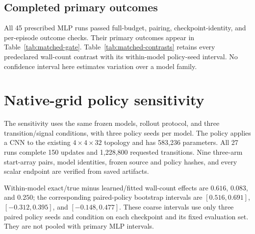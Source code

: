 \subsection{Completed primary outcomes}
All 45 prescribed MLP runs passed full-budget, pairing, checkpoint-identity, and per-episode outcome
checks. Their primary outcomes appear in Table~\ref{tab:matched-gate}. Table~\ref{tab:matched-contrasts}
retains every predeclared wall-count contrast with its within-model policy-seed interval. No confidence
interval here estimates variation over a model family.

\begin{table}[ht]
\centering
\caption{\textbf{The exact training environment does not make this PPO recipe solve the gate.}
Final real-environment outcomes, mean $\pm$ sample standard deviation across five policy seeds
per row. Each of three fitted models receives all three matched conditions. None of the 45 policies
exceeds $50\%$ survival. ``Fitted'' means the unchanged learned reward and termination heads;
``true'' means simulator signals.}
\label{tab:matched-gate}
\end{table}

\begin{table}[ht]
\centering
\caption{Matched primary wall-count differences. Intervals are 95\% percentile bootstraps over
five paired policy seeds within one fixed model, conditional on its evaluation set. They are
unadjusted descriptive intervals; all three prespecified contrasts are retained.}
\label{tab:matched-contrasts}
\end{table}



\section{Native-grid policy sensitivity}
\label{app:native-grid}
The sensitivity uses the same frozen models, rollout protocol, and three transition/signal
conditions, with three policy seeds per model. The policy applies a CNN to the existing
$4\times4\times32$ topology and has 583,236 parameters. All 27 runs complete 150 updates and
1,228,800 requested transitions. Nine three-arm start-array pairs, model identities, frozen source
and policy hashes, and every scalar endpoint are verified from saved artifacts.

\begin{table}[ht]
\centering
\caption{Native-grid CNN sensitivity, kept separate from the primary MLP campaign. Each cell is
mean $\pm$ sample standard deviation across three policies from one fixed model. None of the
27 policies exceeds $50\%$ survival.}
\label{tab:native-gate}
\end{table}

Within-model exact/true minus learned/fitted wall-count effects are $0.616$, $0.083$, and $0.250$;
the corresponding paired-policy bootstrap intervals are $[0.516,0.691]$, $[-0.312,0.395]$, and
$[-0.148,0.477]$. These coarse intervals use only three paired policy seeds and condition on each
checkpoint and its fixed evaluation set. They are not pooled with primary MLP intervals.
